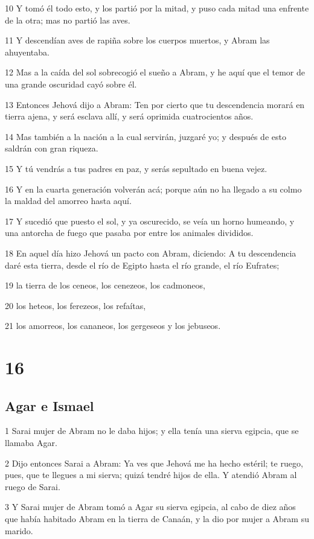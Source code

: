 10 Y tomó él todo esto, y los partió por la mitad, y puso cada mitad una enfrente de la otra; mas no partió las aves.

11 Y descendían aves de rapiña sobre los cuerpos muertos, y Abram las ahuyentaba.

12 Mas a la caída del sol sobrecogió el sueño a Abram, y he aquí que el temor de una grande oscuridad cayó sobre él.

13 Entonces Jehová dijo a Abram: Ten por cierto que tu descendencia morará en tierra ajena, y será esclava allí, y será oprimida cuatrocientos años.

14 Mas también a la nación a la cual servirán, juzgaré yo; y después de esto saldrán con gran riqueza.

15 Y tú vendrás a tus padres en paz, y serás sepultado en buena vejez.

16 Y en la cuarta generación volverán acá; porque aún no ha llegado a su colmo la maldad del amorreo hasta aquí.

17 Y sucedió que puesto el sol, y ya oscurecido, se veía un horno humeando, y una antorcha de fuego que pasaba por entre los animales divididos.

18 En aquel día hizo Jehová un pacto con Abram, diciendo: A tu descendencia daré esta tierra, desde el río de Egipto hasta el río grande, el río Eufrates;

19 la tierra de los ceneos, los cenezeos, los cadmoneos,

20 los heteos, los ferezeos, los refaítas,

21 los amorreos, los cananeos, los gergeseos y los jebuseos.

\chapter{16}

\section{Agar e Ismael}

1 Sarai mujer de Abram no le daba hijos; y ella tenía una sierva egipcia, que se llamaba Agar.

2 Dijo entonces Sarai a Abram: Ya ves que Jehová me ha hecho estéril; te ruego, pues, que te llegues a mi sierva; quizá tendré hijos de ella. Y atendió Abram al ruego de Sarai.

3 Y Sarai mujer de Abram tomó a Agar su sierva egipcia, al cabo de diez años que había habitado Abram en la tierra de Canaán, y la dio por mujer a Abram su marido.


